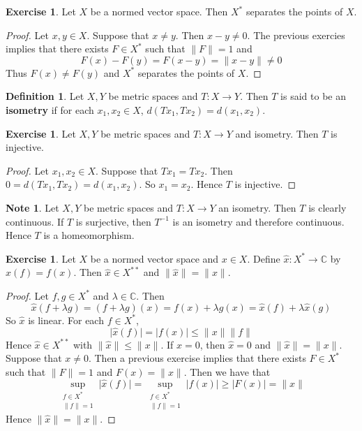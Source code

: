 \documentclass[12pt]{amsart}
\theoremstyle{definition}
\newtheorem{defn}[definition]{Definition}
\newtheorem{note}[definition]{Note}
\newtheorem{ex}[definition]{Exercise}
\newcommand{\lam}{\lambda}
\newcommand{\C}{\mathbb{C}}
\begin{document}
	\begin{ex}
		Let $X$ be a normed vector space. Then $X^*$ separates the points of $X$. 
	\end{ex}
	
	\begin{proof}
		Let $x, y \in X$. Suppose that $x \neq y$. Then $x-y \neq 0$. The previous exercies implies that there exists $F \in X^*$ such that $\|F \|= 1$ and $$F(x) - F(y) = F(x-y) = \|x-y \|\neq 0$$ Thus $F(x) \neq F(y)$ and $X^*$ separates the points of $X$.
	\end{proof}
	
	\begin{defn}
		Let $X, Y$ be metric spaces and $T : X \rightarrow Y$. Then $T$ is said to be an \textbf{isometry} if for each $x_1, x_2 \in X$, $d( Tx_1, Tx_2) = d(x_1,x_2) $.
	\end{defn}
	
	\begin{ex}
		Let $X,Y$ be metric spaces and $T:X \rightarrow Y$ and isometry. Then $T$ is injective.
	\end{ex}
	
	\begin{proof}
		Let $x_1, x_2 \in X$. Suppose that $Tx_1=Tx_2$. Then $0= d( Tx_1, Tx_2) = d(x_1,x_2)$. So $x_1 = x_2$. Hence $T$ is injective.
	\end{proof}
	
	\begin{note}
		Let $X,Y$ be metric spaces and $T:X \rightarrow Y$ an isometry. Then $T$ is clearly continuous. If $T$ is surjective, then $T^{-1}$ is an isometry and therefore continuous. Hence $T$ is a homeomorphism.
	\end{note}
	
	\begin{ex}
		Let $X$ be a normed vector space and $x \in X$. Define $\hat{x}:X^* \rightarrow \C$ by $\hat{x}(f) = f(x)$. Then $\hat{x} \in X^{**}$ and $\|\hat{x} \|= \|x \|$.
	\end{ex}
	
	\begin{proof}
		Let $f,g \in X^*$ and $\lam \in \C$. Then $$\hat{x}(f+\lam g) = (f+ \lam g)(x) = f(x) + \lam g(x) = \hat{x}(f) + \lam \hat{x}(g)$$
		So $\hat{x}$ is linear. For each $f \in X^*$, $$\vert \hat{x}(f) \vert = \vert f(x) \vert \leq \|x \|\|f \|$$ Hence $\hat{x} \in X^{**}$ with $\|\hat{x} \|\leq \|x \|$. If $x=0$, then $\hat{x} = 0$ and $\|\hat{x} \|= \|x \|$. Suppose that $x \neq 0$. Then a previous exercise implies that there exists $F \in X^*$ such that $\|F \|=1$ and $F(x) = \|x \|$. Then we have that $$\sup_{\substack{f \in X^* \\ \|f \|= 1 } } \vert \hat{x}(f) \vert  = \sup_{\substack{f \in X^* \\ \|f \|= 1 }}  \vert f(x) \vert \geq \vert F(x) \vert = \|x \|$$
		Hence $\|\hat{x} \|= \|x \|$.
	\end{proof}
	
\end{document}
